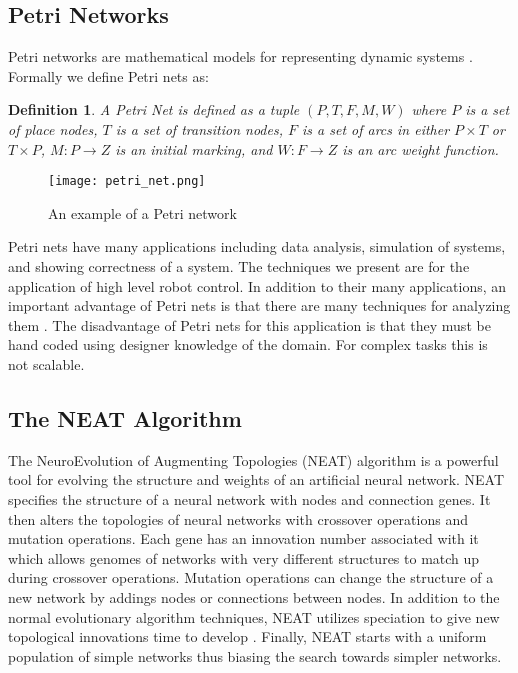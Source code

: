 \documentclass[12pt,a4paper,twocolumn]{article}
\newtheorem{myDef}{Definition}
\begin{document}
\subsection{Petri Networks}
Petri networks are mathematical models for representing dynamic systems \cite{ziparo2011petri}. Formally we define Petri nets as:
\begin{myDef}
A Petri Net is defined as a tuple $(P,T,F,M,W)$ where $P$ is a set of place nodes, $T$ is a set of transition nodes, $F$ is a set of arcs in either $P \times T$ or $T \times P$, $M: P \rightarrow Z$ is an initial marking, and $W: F \rightarrow Z$ is an arc weight function.
\end{myDef}
\begin{figure}[h]
\centering
\texttt{[image: petri\_net.png]}
\caption[]{An example of a Petri network \label{exampleNet}}
\end{figure}
Petri nets have many applications including data analysis, simulation of systems, and showing correctness of a system. The techniques we present are for the application of high level robot control. In addition to their many applications, an important advantage of Petri nets is that there are many techniques for analyzing them \cite{barrett2010architecture}. The disadvantage of Petri nets for this application is that they must be hand coded using designer knowledge of the domain. For complex tasks this is not scalable.

\subsection{The NEAT Algorithm}

The NeuroEvolution of Augmenting Topologies (NEAT) algorithm is a powerful tool for evolving the structure and weights of an artificial neural network. NEAT specifies the structure of a neural network with nodes and connection genes. It then alters the topologies of neural networks with crossover operations and mutation operations. Each gene has an innovation number associated with it which allows genomes of networks with very different structures to match up during crossover operations. Mutation operations can change the structure of a new network by addings nodes or connections between nodes. In addition to the normal evolutionary algorithm techniques, NEAT utilizes speciation to give new topological innovations time to develop \cite{neat}. Finally, NEAT starts with a uniform population of simple networks thus biasing the search towards simpler networks.
\end{document}
